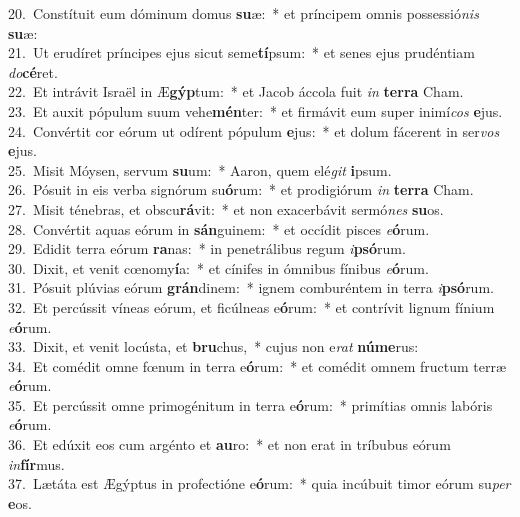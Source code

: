 {20.~}Constítuit eum dóminum domus \textbf{su}æ:~* et príncipem omnis possessió\textit{nis} \textbf{su}æ:\\
{21.~}Ut erudíret príncipes ejus sicut seme\textbf{tí}psum:~* et senes ejus prudéntiam \textit{do}\textbf{cé}ret.\\
{22.~}Et intrávit Israël in Æ\textbf{gýp}tum:~* et Jacob áccola fuit \textit{in} \textbf{ter}\textbf{ra} Cham.\\
{23.~}Et auxit pópulum suum vehe\textbf{mén}ter:~* et firmávit eum super inimí\textit{cos} \textbf{e}jus.\\
{24.~}Convértit cor eórum ut odírent pópulum \textbf{e}jus:~* et dolum fácerent in ser\textit{vos} \textbf{e}jus.\\
{25.~}Misit Móysen, servum \textbf{su}um:~* Aaron, quem elé\textit{git} \textbf{i}psum.\\
{26.~}Pósuit in eis verba signórum su\textbf{ó}rum:~* et prodigiórum \textit{in} \textbf{ter}\textbf{ra} Cham.\\
{27.~}Misit ténebras, et obscu\textbf{rá}vit:~* et non exacerbávit sermó\textit{nes} \textbf{su}os.\\
{28.~}Convértit aquas eórum in \textbf{sán}guinem:~* et occídit pisces \textit{e}\textbf{ó}rum.\\
{29.~}Edidit terra eórum \textbf{ra}nas:~* in penetrálibus regum \textit{i}\textbf{psó}rum.\\
{30.~}Dixit, et venit cœnomy\textbf{í}a:~* et cínifes in ómnibus fínibus \textit{e}\textbf{ó}rum.\\
{31.~}Pósuit plúvias eórum \textbf{grán}dinem:~* ignem comburéntem in terra \textit{i}\textbf{psó}rum.\\
{32.~}Et percússit víneas eórum, et ficúlneas e\textbf{ó}rum:~* et contrívit lignum fínium \textit{e}\textbf{ó}rum.\\
{33.~}Dixit, et venit locústa, et \textbf{bru}chus,~* cujus non e\textit{rat} \textbf{nú}\textbf{me}rus:\\
{34.~}Et comédit omne fœnum in terra e\textbf{ó}rum:~* et comédit omnem fructum terræ \textit{e}\textbf{ó}rum.\\
{35.~}Et percússit omne primogénitum in terra e\textbf{ó}rum:~* primítias omnis labóris \textit{e}\textbf{ó}rum.\\
{36.~}Et edúxit eos cum argénto et \textbf{au}ro:~* et non erat in tríbubus eórum \textit{in}\textbf{fír}mus.\\
{37.~}Lætáta est Ægýptus in profectióne e\textbf{ó}rum:~* quia incúbuit timor eórum su\textit{per} \textbf{e}os.\\

